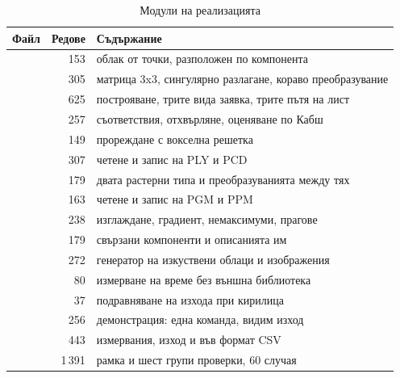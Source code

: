 \begin{table}[H]
\centering
\caption{Модули на реализацията}
\label{tab:files}
\begin{tabular}{@{}L{4.4cm}rL{7.4cm}@{}}
\toprule
\textbf{Файл} & \textbf{Редове} & \textbf{Съдържание} \\
\midrule
{}        & 153 & облак от точки, разположен по компонента \\
   & 305 & матрица 3x3, сингулярно разлагане, кораво преобразувание \\
      & 625 & построяване, трите вида заявка, трите пътя на лист \\
         & 257 & съответствия, отхвърляне, оценяване по Кабш \\
 & 149 & прореждане с вокселна решетка \\
   & 307 & четене и запис на PLY и PCD \\
       & 179 & двата растерни типа и преобразуванията между тях \\
   & 163 & четене и запис на PGM и PPM \\
  & 238 & изглаждане, градиент, немаксимуми, прагове \\
    & 179 & свързани компоненти и описанията им \\
   & 272 & генератор на изкуствени облаци и изображения \\
              &  80 & измерване на време без външна библиотека \\
                &  37 & подравняване на изхода при кирилица \\
           & 256 & демонстрация: една команда, видим изход \\
    & 443 & измервания, изход и във формат CSV \\
                  & 1\,391 & рамка и шест групи проверки, 60 случая \\
\bottomrule
\end{tabular}
\end{table}

